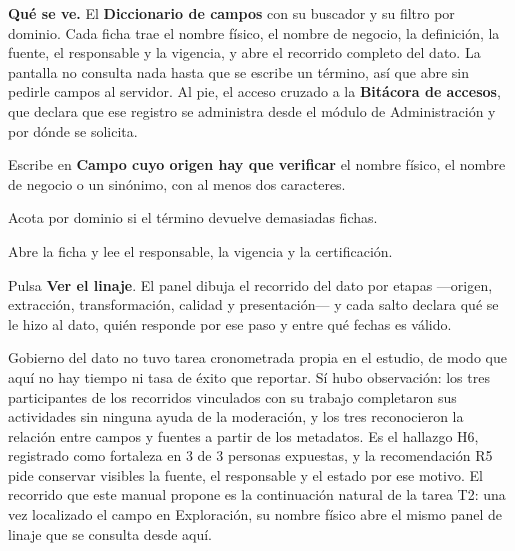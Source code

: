 \textbf{Qué se ve.} El \textbf{Diccionario de campos} con su buscador y su filtro por dominio.
Cada ficha trae el nombre físico, el nombre de negocio, la definición, la fuente, el responsable y
la vigencia, y abre el recorrido completo del dato. La pantalla no consulta nada hasta que se
escribe un término, así que abre sin pedirle campos al servidor. Al pie, el acceso cruzado a la
\textbf{Bitácora de accesos}, que declara que ese registro se administra desde el módulo de
Administración y por dónde se solicita.


\begin{uxpreg}
  \item Escribe en \textbf{Campo cuyo origen hay que verificar} el nombre físico, el nombre de
    negocio o un sinónimo, con al menos dos caracteres.
  \item Acota por dominio si el término devuelve demasiadas fichas.
  \item Abre la ficha y lee el responsable, la vigencia y la certificación.
  \item Pulsa \textbf{Ver el linaje}. El panel dibuja el recorrido del dato por etapas ---origen,
    extracción, transformación, calidad y presentación--- y cada salto declara qué se le hizo al
    dato, quién responde por ese paso y entre qué fechas es válido.
\end{uxpreg}

\begin{uxnota}
Gobierno del dato no tuvo tarea cronometrada propia en el estudio, de modo que aquí no hay tiempo
ni tasa de éxito que reportar. Sí hubo observación: los tres participantes de los recorridos
vinculados con su trabajo completaron sus actividades sin ninguna ayuda de la moderación, y los
tres reconocieron la relación entre campos y fuentes a partir de los metadatos. Es el hallazgo H6,
registrado como fortaleza en 3 de 3 personas expuestas, y la recomendación R5 pide conservar
visibles la fuente, el responsable y el estado por ese motivo. El recorrido que este manual
propone es la continuación natural de la tarea T2: una vez localizado el campo en Exploración, su
nombre físico abre el mismo panel de linaje que se consulta desde aquí.
\end{uxnota}

